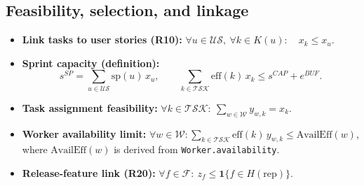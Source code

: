 \documentclass[11pt,a4paper]{article}
\begin{document}
\subsection*{Feasibility, selection, and linkage}
\begin{itemize}[leftmargin=2em]
  \item \textbf{Link tasks to user stories (R10):} $\forall u\in\mathcal{US},\ \forall k\in K(u):\quad x_k \le x_u.$
  \item \textbf{Sprint capacity (definition):}
  \[
  s^{SP} = \sum_{u\in\mathcal{US}} \text{sp}(u)\,x_u, \qquad
  \sum_{k\in\mathcal{TSK}}\text{eff}(k)\,x_k \le s^{CAP} + e^{BUF}.
  \]
  \item \textbf{Task assignment feasibility:} $\forall k\in\mathcal{TSK}:\ \sum_{w\in\mathcal{W}} y_{w,k} = x_k.$
  \item \textbf{Worker availability limit:} $\forall w\in\mathcal{W}: \sum_{k\in\mathcal{TSK}} \text{eff}(k)\,y_{w,k} \le \text{AvailEff}(w)$, where $\text{AvailEff}(w)$ is derived from \texttt{Worker.availability}.
  \item \textbf{Release-feature link (R20):} $\forall f\in\mathcal{F}:\ z_f \le \mathbf{1}\{f \in H(\mathrm{rep})\}$.
\end{itemize}
\end{document}
